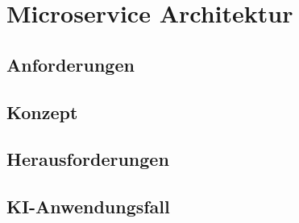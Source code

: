 \chapter{Microservice Architektur}
\section{Anforderungen}
\section{Konzept}
\section{Herausforderungen}
\section{KI-Anwendungsfall}